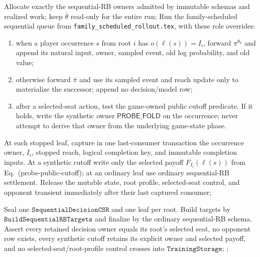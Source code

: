 \documentclass[10pt,varwidth=190mm,border=1mm]{standalone}
\newcommand{\Obj}[1]{\texttt{#1}}
\begin{document}
\begin{algorithm}[H]
\caption{$\Obj{TrainingStorage}_g\gets
\Obj{SharedResponseRollout}(\theta_k,\bar\theta,G_k)$}
\label{alg:shared-response-rollout}
\DontPrintSemicolon
{}

Allocate exactly the sequential-RB owners admitted by immutable schemas and
realized work; keep $\bar\theta$ read-only for the entire run;
Run the family-scheduled sequential queue from
\texttt{family\_scheduled\_rollout.tex}, with these role overrides:
\begin{enumerate}[label=(\roman*)]
  \item when a player occurrence $s$ from root $i$ has
  $o(\ell(s))=I_i$, forward $\pi^{\theta_k}$ and append its natural input,
  owner, sampled event, old log probability, and old value;
  \item otherwise forward $\bar\pi$ and use its sampled event and reach update
  only to materialize the successor; append no decision/model row;
  \item after a selected-seat action, test the game-owned public cutoff predicate.
  If it holds, write the synthetic owner $\mathsf{PROBE\_FOLD}$ on the occurrence;
  never attempt to derive that owner from the underlying game-state phase.
\end{enumerate}
At each stopped leaf, capture in one last-consumer transaction the occurrence
owner, $I_i$, stopped reach, logical completion key, and immutable completion
inputs.  At a synthetic cutoff write only the selected payoff
$F_{I_i}(\ell(s))$ from Eq.~\textnormal{(probe-public-cutoff)}; at an ordinary
leaf use ordinary sequential-RB settlement.  Release the mutable state, root
profile, selected-seat control, and opponent transient immediately after their
last captured consumer;

Seal one $\Obj{SequentialDecisionCSR}$ and one leaf per root.  Build targets by
$\Obj{BuildSequentialRBTargets}$ and finalize by the ordinary sequential-RB
schema.  Assert every retained decision owner equals its root's selected seat,
no opponent row exists, every synthetic cutoff retains its explicit owner and
selected payoff, and no selected-seat/root-profile control crosses into
$\Obj{TrainingStorage}$;
\Return{$\Obj{TrainingStorage}_g$};
\end{algorithm}
\end{document}
